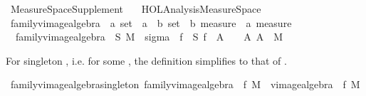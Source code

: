 %
\begin{isabellebody}%
%
%
\isadelimtheory
\isanewline
\isanewline
%
\endisadelimtheory
%
\isatagtheory
{}\isamarkupfalse%
\ Measure{\isacharunderscore}{\kern0pt}Space{\isacharunderscore}{\kern0pt}Supplement\isanewline
\ \ \ {\isachardoublequoteopen}HOL{\isacharminus}{\kern0pt}Analysis{\isachardot}{\kern0pt}Measure{\isacharunderscore}{\kern0pt}Space{\isachardoublequoteclose}\isanewline
{}%
\endisatagtheory
{\isafoldtheory}%
%
\isadelimtheory
%
\endisadelimtheory
%
\isadelimdocument
%
\endisadelimdocument
%
\isatagdocument
%
\isamarkuptrue%
%
\isamarkuptrue%
%
\endisatagdocument
{\isafolddocument}%
%
\isadelimdocument
%
\endisadelimdocument
{}\isamarkupfalse%
\ family{\isacharunderscore}{\kern0pt}vimage{\isacharunderscore}{\kern0pt}algebra\ {\isacharcolon}{\kern0pt}{\isacharcolon}{\kern0pt}\ {\isachardoublequoteopen}{\isacharprime}{\kern0pt}a\ set\ {\isasymRightarrow}\ {\isacharparenleft}{\kern0pt}{\isacharprime}{\kern0pt}a\ {\isasymRightarrow}\ {\isacharprime}{\kern0pt}b{\isacharparenright}{\kern0pt}\ set\ {\isasymRightarrow}\ {\isacharprime}{\kern0pt}b\ measure\ {\isasymRightarrow}\ {\isacharprime}{\kern0pt}a\ measure{\isachardoublequoteclose}\ \isanewline
\ \ {\isachardoublequoteopen}family{\isacharunderscore}{\kern0pt}vimage{\isacharunderscore}{\kern0pt}algebra\ {\isasymOmega}\ S\ M\ {\isasymequiv}\ sigma\ {\isasymOmega}\ {\isacharparenleft}{\kern0pt}{\isasymUnion}f\ {\isasymin}\ S{\isachardot}{\kern0pt}\ {\isacharbraceleft}{\kern0pt}f\ {\isacharminus}{\kern0pt}{\isacharbackquote}{\kern0pt}\ A\ {\isasyminter}\ {\isasymOmega}\ {\isacharbar}{\kern0pt}\ A{\isachardot}{\kern0pt}\ A\ {\isasymin}\ M{\isacharbraceright}{\kern0pt}{\isacharparenright}{\kern0pt}{\isachardoublequoteclose}%
\begin{isamarkuptext}%
For singleton , i.e.  for some , the definition simplifies to that of .%
\end{isamarkuptext}\isamarkuptrue%
\isamarkupfalse%
\ family{\isacharunderscore}{\kern0pt}vimage{\isacharunderscore}{\kern0pt}algebra{\isacharunderscore}{\kern0pt}singleton{\isacharcolon}{\kern0pt}\ {\isachardoublequoteopen}family{\isacharunderscore}{\kern0pt}vimage{\isacharunderscore}{\kern0pt}algebra\ {\isasymOmega}\ {\isacharbraceleft}{\kern0pt}f{\isacharbraceright}{\kern0pt}\ M\ {\isacharequal}{\kern0pt}\ vimage{\isacharunderscore}{\kern0pt}algebra\ {\isasymOmega}\ f\ M{\isachardoublequoteclose}%

\end{isabellebody}

